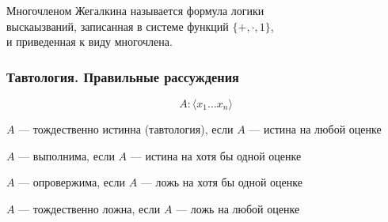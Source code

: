 \documentclass{article}
\begin{document}
Многочленом Жегалкина называется формула логики  \\
выскаызваний, записанная в системе функций $\{ +, \cdot, 1 \}$, \\
и приведенная к виду многочлена.

\subsubsection{Тавтология. Правильные рассуждения}

\[ A: \langle x_1 \dots x_n \rangle \]

$A$ --- тождественно истинна (тавтология), если $A$ --- истина на любой оценке

$A$ --- выполнима, если $A$ --- истина на хотя бы одной оценке

$A$ --- опровержима, если $A$ --- ложь на хотя бы одной оценке

$A$ --- тождественно ложна, если $A$ --- ложь на любой оценке
\end{document}
